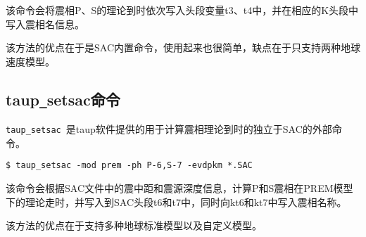 该命令会将震相P、S的理论到时依次写入头段变量t3、t4中，并在相应的K头段中写入震相名信息。

该方法的优点在于是SAC内置命令，使用起来也很简单，缺点在于只支持两种地球速度模型。

\subsection{taup\texttt{\_}setsac命令}
\verb+taup_setsac+~是taup软件提供的用于计算震相理论到时的独立于SAC的外部命令。

\begin{verbatim}
$ taup_setsac -mod prem -ph P-6,S-7 -evdpkm *.SAC
\end{verbatim}

该命令会根据SAC文件中的震中距和震源深度信息，计算P和S震相在PREM模型下的理论走时，并写入到SAC头段t6和t7中，同时向kt6和kt7中写入震相名称。

该方法的优点在于支持多种地球标准模型以及自定义模型。
